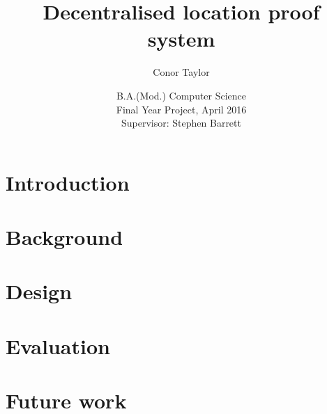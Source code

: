 \documentclass[12pt]{report}
\title{Decentralised location proof system}
\author{Conor Taylor}
\date{
	B.A.(Mod.) Computer Science\\
	Final Year Project, April 2016\\
	Supervisor: Stephen Barrett
}
\begin{document}
\maketitle

\tableofcontents
\newpage

\listoffigures
\newpage

\chapter{Introduction}


\chapter{Background}


\chapter{Design}


\chapter{Evaluation}


\chapter{Future work}
\end{document}
